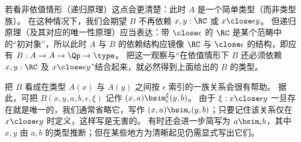 若看非依值情形（递归原理）这点会更清楚：此时 $A$ 是一个简单类型（而非类型族）。
在这种情况下，我们会期望 $B$ 不再依赖 $x,y:\RC$ 或 $x\close\epsilon y$。
但递归原理（及其对应的唯一性原理）应当表达：带 $\close\epsilon$ 的 $\RC$ 是某个范畴中的“初对象”，所以此时 $A$ 与 $B$ 的依赖结构应镜像 $\RC$ 与 $\close\epsilon$ 的结构，即应有 $B:A\to A\to \Qp \to \type$。
把这一观察与“在依值情形下 $B$ 还必须依赖 $x,y:\RC$ 及 $x\close\epsilon y$”结合起来，就必然得到上面给出的 $B$ 的类型。

把 $B$ 看成在类型 $A(x)$ 与 $A(y)$ 之间按 $\epsilon$ 索引的一族关系会很有帮助。
据此，可把 $B(x,y,a,b,\epsilon,\xi)$ 记作 $(x,a) \bsim_\epsilon^\xi (y,b)$。
由于 $\xi:x\close\epsilon y$ 一旦存在就是唯一的，我们通常省略它，写作 $(x,a) \bsim_\epsilon (y,b)$；只要记住该关系仅在 $x\close\epsilon y$ 时定义，这样写是无害的。
有时还会进一步简写为 $a\bsim_\epsilon b$，其中 $x,y$ 由 $a,b$ 的类型推断；但在某些地方为清晰起见仍需显式写出它们。

